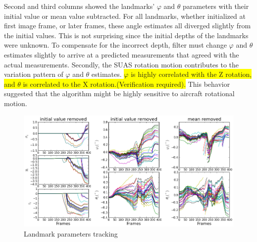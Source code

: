Second and third columns showed the landmarks' $\varphi$ and $\theta$
parameters with their initial value or mean value subtracted. For all
landmarks, whether initialized at first image frame, or later frames,
these angle estimates all diverged slightly from the initial values.
This is not surprising since the initial depths of the landmarks were
unknown. To compensate for the incorrect depth, filter must change
$\varphi$ and $\theta$ estimates slightly to arrive at a predicted
measurements that agreed with the actual measurements. Secondly, the
SUAS rotation motion contributes to the variation pattern of $\varphi$
and $\theta$ estimates. \colorbox{yellow}{$\varphi$ is highly correlated with
  the Z rotation, and $\theta$ is correlated to the X
  rotation.(Verification required).} This behavior
suggested that the algorithm might be highly sensitive to aircraft
rotational motion.

\begin{figure}[h]
\centering
\includegraphics[width=14cm, keepaspectratio=true]
{./Figures/fltfig/cut1/Figure20.png}
\caption{Landmark parameters tracking}
\label{fltfig:2}
\end{figure}
\FloatBarrier

